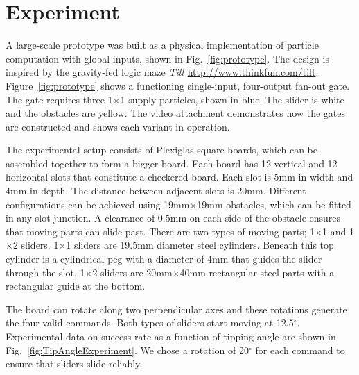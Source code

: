 \documentclass[letterpaper, 10 pt, conference]{ieeeconf}
\begin{document}
\section{Experiment}\label{sec:Experiment}
A large-scale prototype was built as a physical implementation of particle computation with global inputs, shown in Fig.~\ref{fig:prototype}.  The design is inspired by the gravity-fed logic maze \emph{Tilt\texttrademark}
\url{http://www.thinkfun.com/tilt}. Figure~\ref{fig:prototype} shows a functioning single-input, four-output {\sc fan-out} gate. 
The gate requires three  1$\times$1 supply particles, shown in blue.  The slider is white and the obstacles are yellow.  %
The video attachment demonstrates how the gates are constructed and shows each variant in operation.

The experimental setup consists of Plexiglas square boards, which can be assembled together to form a bigger board. Each board has 12 vertical and 12 horizontal slots that constitute a checkered board. Each slot is 5mm in width and 4mm in depth.  The distance between adjacent slots is 20mm. Different configurations can be achieved using 19mm$\times$19mm obstacles, which can be fitted in any slot junction. A clearance of 0.5mm on each side of the obstacle ensures that moving parts can slide past.  There are two types of moving parts; 1$\times$1 and 1$\times$2 sliders. 1$\times$1 sliders are 19.5mm diameter steel cylinders.  Beneath this top cylinder is a cylindrical peg with a diameter of 4mm that guides the slider through the slot. 1$\times$2 sliders are 20mm$\times$40mm rectangular steel parts with a rectangular guide at the bottom.

The board can rotate along two perpendicular axes and these rotations generate the four valid commands. Both types of sliders start moving at 12.5$^\circ$. Experimental data on success rate as a function of tipping angle are shown in Fig.~\ref{fig:TipAngleExperiment}. We chose a rotation of 20$^\circ$ for each command to ensure that sliders  slide reliably.

\end{document}
